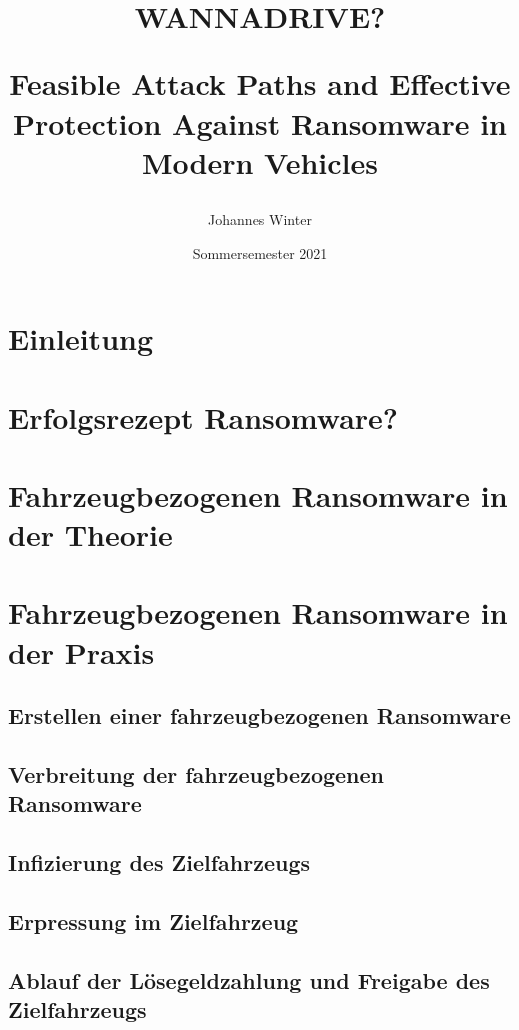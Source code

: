 \documentclass[oneside, 11pt, notitlepage, a4paper, numbers=noenddot]{scrartcl}
\title { \begin{center}
    \textbf{WANNADRIVE?}
\end{center} 
Feasible Attack Paths and Effective Protection
Against Ransomware in Modern Vehicles}
\author{Johannes Winter}
\date  {Sommersemester 2021}
\begin{document}
\maketitle

\section{Einleitung}


\section{Erfolgsrezept Ransomware?}


\section{Fahrzeugbezogenen Ransomware in der Theorie}


\section{Fahrzeugbezogenen Ransomware in der Praxis}

\subsection{Erstellen einer fahrzeugbezogenen Ransomware}

\subsection{Verbreitung der fahrzeugbezogenen Ransomware}

\subsection{Infizierung des Zielfahrzeugs}

\subsection{Erpressung im Zielfahrzeug}

\subsection{Ablauf der Lösegeldzahlung und Freigabe des Zielfahrzeugs}

\end{document}
